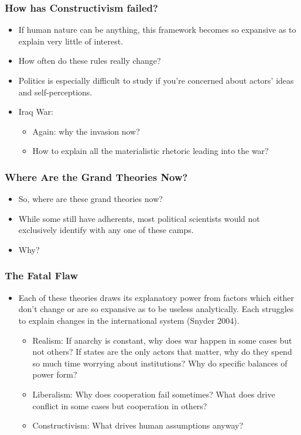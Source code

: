 \documentclass{beamer}
\begin{document}
\begin{frame} 
\frametitle{\LARGE{How has Constructivism failed?}}
\begin{itemize}
    \item If human nature can be anything, this framework becomes so expansive as to explain very little of interest. \pause
    \item How often do these rules really change? \pause 
    \item Politics is especially difficult to study if you're concerned about actors' ideas and self-perceptions. 
    \item Iraq War: \pause 
    \begin{itemize}
        \item Again: why the invasion now? \pause
        \item How to explain all the materialistic rhetoric leading into the war? \pause
    \end{itemize}
\end{itemize}
\end{frame}

\begin{frame} 
\frametitle{\LARGE{Where Are the Grand Theories Now?}}
\begin{itemize}
    \item So, where are these grand theories now? \pause
    \item While some still have adherents, most political scientists would not exclusively identify with any one of these camps. \pause
    \item Why? 
\end{itemize}
\end{frame}

\begin{frame} 
	\frametitle{\LARGE{The Fatal Flaw}}
	\begin{itemize}
		\item Each of these theories draws its explanatory power from factors which either don't change or are so expansive as to be useless analytically. Each struggles to explain changes in the international system (Snyder 2004). \pause
		\begin{itemize}
			\item Realism: If anarchy is constant, why does war happen in some cases but not others? If states are the only actors that matter, why do they spend so much time worrying about institutions? Why do specific balances of power form? \pause
			\item Liberalism: Why does cooperation fail sometimes? What does drive conflict in some cases but cooperation in others? \pause
			\item Constructivism: What drives human assumptions anyway?
		\end{itemize}
	\end{itemize}
\end{frame}
\end{document}
